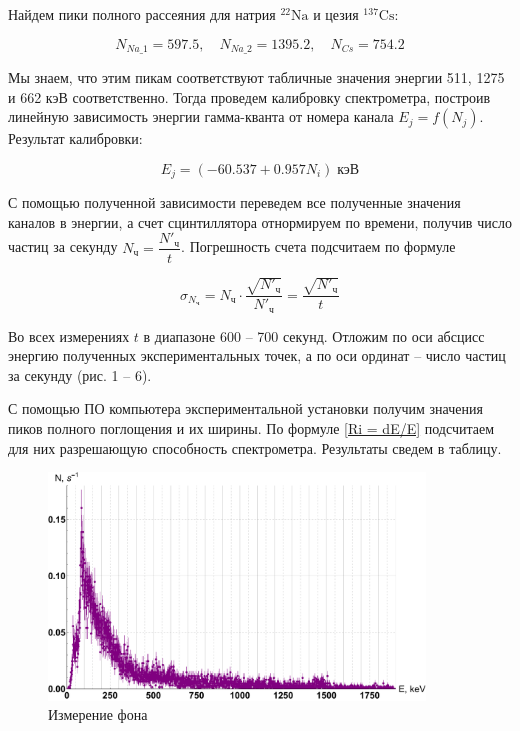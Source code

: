 \documentclass[12pt,a4paper]{article}
\begin{document}
Найдем пики полного рассеяния для натрия $ \mathrm{^{22}Na} $ и цезия $ \mathrm{^{137}Cs} $:
	
\begin{equation}\label{}
	N_{Na\_1} = 597.5, \quad N_{Na\_2} = 1395.2, \quad N_{Cs} =754.2
\end{equation}
	
Мы знаем, что этим пикам соответствуют табличные значения энергии 511, 1275 и 662 кэВ соответственно. Тогда проведем калибровку спектрометра, построив линейную зависимость энергии гамма-кванта от номера канала $ E_j = f(N_j) $. Результат калибровки:
	
\begin{equation}\label{}
	E_j = (-60.537 + 0.957N_i ) \; \text{кэВ}
\end{equation}
	
С помощью полученной зависимости переведем все полученные значения каналов в энергии, а счет сцинтиллятора отнормируем по времени, получив число частиц за секунду $ N_\text{ч} = \dfrac{N'_\text{ч}}{t} $. Погрешность счета подсчитаем по формуле 

\begin{equation}\label{}
	\sigma_{N_\text{ч}} = N_\text{ч} \cdot \dfrac{\sqrt{N'_\text{ч}}}{N'_\text{ч}} = \dfrac{\sqrt{N'_\text{ч}}}{t}
\end{equation}
	
Во всех измерениях $ t $ в диапазоне 600 -- 700 секунд. Отложим по оси абсцисс энергию полученных экспериментальных точек, а по оси ординат -- число частиц за секунду (рис. 1 -- 6).
	
С помощью ПО компьютера экспериментальной установки получим значения пиков полного поглощения и их ширины. По формуле \eqref{Ri = dE/E} подсчитаем для них разрешающую способность спектрометра. Результаты сведем в таблицу.
	
\begin{figure}[H]
	\label{graf_bg}
	\includegraphics[width=10cm]{src/bg.pdf}
	\caption{Измерение фона}
\end{figure} 	
	
\end{document}
